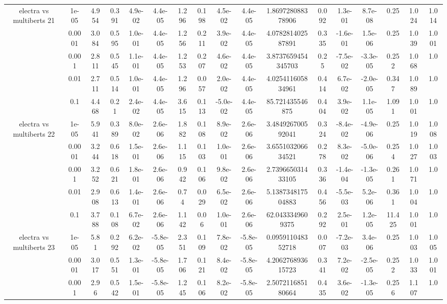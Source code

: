 \begin{tabular}{|c|c|c|c|c|c|c|c|c|c|c|c|c|c|c|c|c|}
\hline
\multirow{5}{*}{electra  vs multiberts 21} & 1e-05 & 4.954 & 0.391 & 4.9e-02 & 4.4e-05 & 1.296 & 0.198 & 4.5e-02 & 4.4e-05 & 1.869728088378906 & 0.092 & 1.3e-01 & 8.7e-08 & 0.25 & 1.024 & 1.014 \\
 & 0.0001 & 3.084 & 0.595 & 1.0e-01 & 4.4e-05 & 1.256 & 0.211 & 3.9e-02 & 4.4e-05 & 4.078281402587891 & 0.335 & -1.6e-01 & 1.5e-06 & 0.25 & 1.039 & 1.001 \\
 & 0.001 & 2.811 & 0.545 & 1.1e-01 & 4.4e-05 & 1.253 & 0.207 & 4.6e-02 & 4.4e-05 & 3.8737659454345703 & 0.25 & -7.5e-02 & -3.3e-05 & 0.252 & 1.068 & 1.0 \\
 & 0.01 & 2.711 & 0.514 & 1.0e-01 & 4.4e-05 & 1.296 & 0.057 & 2.0e-02 & 4.4e-05 & 4.025411605834961 & 0.414 & 6.7e-02 & -2.0e-05 & 0.347 & 1.089 & 1.0 \\
 & 0.1 & 4.468 & 0.21 & 2.4e-02 & 4.4e-05 & 3.615 & 0.113 & -5.0e-02 & 4.4e-05 & 85.721435546875 & 0.404 & 3.9e-02 & 1.1e-05 & 1.091 & 1.001 & 1.0 \\
\hline
\multirow{5}{*}{electra  vs multiberts 22} & 1e-05 & 5.941 & 0.389 & 8.0e-02 & 2.6e-06 & 1.882 & 0.108 & 8.9e-02 & 2.6e-06 & 3.484926700592041 & 0.324 & -8.4e-02 & -4.9e-06 & 0.25 & 1.019 & 1.008 \\
 & 0.0001 & 3.244 & 0.618 & 1.5e-01 & 2.6e-06 & 1.115 & 0.103 & 1.0e-01 & 2.6e-06 & 3.655103206634521 & 0.278 & 8.3e-02 & -5.0e-06 & 0.254 & 1.027 & 1.003 \\
 & 0.001 & 3.252 & 0.621 & 1.8e-01 & 2.6e-06 & 0.942 & 0.106 & 9.8e-02 & 2.6e-06 & 2.739665031433105 & 0.336 & -1.4e-04 & -1.3e-05 & 0.261 & 1.071 & 1.0 \\
 & 0.01 & 2.908 & 0.613 & 1.4e-01 & 2.6e-06 & 0.74 & 0.029 & 6.5e-02 & 2.6e-06 & 5.138734817504883 & 0.456 & -5.5e-03 & 5.2e-06 & 0.361 & 1.004 & 1.0 \\
 & 0.1 & 3.788 & 0.108 & 6.7e-02 & 2.6e-06 & 1.142 & 0.06 & 1.0e-01 & 2.6e-06 & 62.0433349609375 & 0.292 & 2.5e-01 & 1.2e-05 & 11.425 & 1.001 & 1.0 \\
\hline
\multirow{5}{*}{electra  vs multiberts 23} & 1e-05 & 5.81 & 0.292 & 6.2e-02 & -5.8e-05 & 2.351 & 0.109 & 7.8e-02 & -5.8e-05 & 0.095911048352718 & 0.007 & -7.2e-03 & 3.4e-06 & 0.25 & 1.003 & 1.005 \\
 & 0.0001 & 3.017 & 0.551 & 1.3e-01 & -5.8e-05 & 1.706 & 0.121 & 8.4e-02 & -5.8e-05 & 4.206276893615723 & 0.341 & 7.2e-02 & -2.5e-05 & 0.252 & 1.033 & 1.001 \\
 & 0.001 & 2.96 & 0.542 & 1.5e-01 & -5.8e-05 & 1.245 & 0.106 & 8.2e-02 & -5.8e-05 & 2.507211685180664 & 0.435 & 3.6e-02 & -1.3e-05 & 0.256 & 1.107 & 1.0 \\

\end{tabular}
